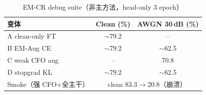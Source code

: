 \begin{table}[htbp]
  \centering
  \caption{EM-CR debug suite（非主方法，head-only 3 epoch）}
  \label{tab:ch5_emcr}
  \begin{tabular}{lcc}
    \toprule
    变体 & Clean (\%) & AWGN 30\,dB (\%) \\
    \midrule
    A clean-only FT & $\sim$79.2 & -- \\
    B EM-Aug CE & $\sim$79.2 & $\sim$62.5 \\
    C weak CFO aug & -- & 70.8 \\
    D stopgrad KL & $\sim$79.2 & $\sim$62.5 \\
    Smoke（强 CFO+全主干） & \multicolumn{2}{c}{clean 83.3$\rightarrow$20.8（崩溃）} \\
    \bottomrule
  \end{tabular}
\end{table}
